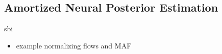 



\subsection{Amortized Neural Posterior Estimation} \label{sec:flow}

sbi~\citep{greenberg2019, tejero-cantero2020}

\cite{wong2020}
\cite{dax2021}
\cite{zhang2021}

\begin{itemize}
    \item example normalizing flows and MAF 
\end{itemize}
